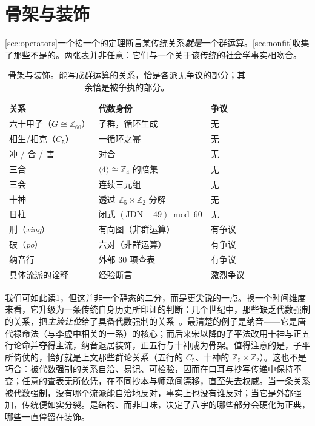 \documentclass[11pt,a4paper,fontset=none]{ctexart}
\theoremstyle{definition}
\theoremstyle{remark}
\newcommand{\Z}{\mathbb{Z}}
\begin{document}
\section{骨架与装饰}\label{sec:skeleton}
\cref{sec:operators}一个接一个的定理断言某传统关系\emph{就是}一个群运算。\cref{sec:nonfit}收集了那些不是的。两张表并非任意：它们与一个关于该传统的社会学事实相吻合。

\begin{table}[h]\centering
\caption{骨架与装饰。能写成群运算的关系，恰是各派无争议的部分；其余恰是被争执的部分。\label{tab:skel}}
\small
\begin{tabular}{l l l}
\toprule
关系 & 代数身份 & 争议\\
\midrule
六十甲子（$G\cong\Z_{60}$） & 子群，循环生成 & 无\\
相生/相克（$C_5$） & 一循环之幂 & 无\\
冲 / 合 / 害 & 对合 & 无\\
三合 & $\langle4\rangle\cong\Z_4$ 的陪集 & 无\\
三会 & 连续三元组 & 无\\
十神 & 透过 $\Z_5\times\Z_2$ 分解 & 无\\
日柱 & 闭式 $(\mathrm{JDN}+49)\bmod60$ & 无\\ \midrule
刑（\emph{xing}） & 有向图（非群运算） & 有争议\\
破（\emph{po}） & 六对（非群运算） & 有争议\\
纳音行 & 外部 $30$ 项查表 & 有争议\\
具体流派的诠释 & 经验断言 & 激烈争议\\
\bottomrule
\end{tabular}
\end{table}

我们可如此读\cref{tab:skel}，但这并非一个静态的二分，而是更尖锐的一点。换一个时间维度来看，它升级为一条传统自身历史所印证的判断：几个世纪中，那些缺乏代数强制的关系，把\emph{主流让位}给了具备代数强制的关系~\cite{smith1991,yuanhai,sanming}。最清楚的例子是纳音——它是唐代禄命法（与李虚中相关的一系）的核心；而后来宋以降的子平法改用十神与正五行论命并夺得主流，纳音退居装饰，正五行与十神成为骨架。值得注意的是，子平所倚仗的，恰好就是上文那些群论关系（五行的 $C_5$、十神的 $\Z_5\times\Z_2$）。这也不是巧合：被代数强制的关系自洽、易记、可检验，因而在口耳与抄写传递中保持不变；任意的查表无所依凭，在不同抄本与师承间漂移，直至失去权威。当一条关系被代数强制，没有哪个流派能自洽地反对，事实上也没有谁反对；当它是外部强加，传统便如实分裂。是结构、而非口味，决定了八字的哪些部分会硬化为正典，哪些一直停留在装饰。
\end{document}
